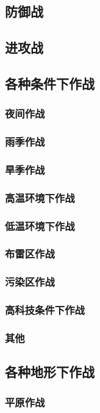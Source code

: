 \documentclass[UTF8]{../ApplicationUniverse}
\begin{document}
    \subsection{防御战}
    \subsection{进攻战}
    \subsection{各种条件下作战}
        \subsubsection{夜间作战}
        \subsubsection{雨季作战}
        \subsubsection{旱季作战}
        \subsubsection{高温环境下作战}
        \subsubsection{低温环境下作战}
        \subsubsection{布雷区作战}
        \subsubsection{污染区作战}
        \subsubsection{高科技条件下作战}
        \subsubsection{其他}
    \subsection{各种地形下作战}
        \subsubsection{平原作战}
\end{document}
